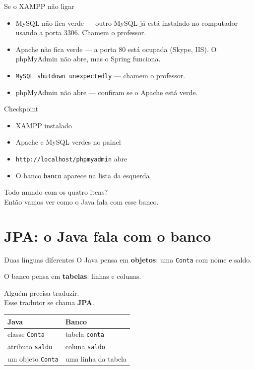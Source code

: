 \documentclass[aspectratio=169,11pt]{beamer}
\begin{document}
\begin{frame}{Se o XAMPP não ligar}
  \begin{itemize}
    \item MySQL não fica verde --- outro MySQL já está instalado
          no computador usando a porta 3306. Chamem o professor.
    \item Apache não fica verde --- a porta 80 está ocupada
          (Skype, IIS). O phpMyAdmin não abre, mas o Spring funciona.
    \item \texttt{MySQL shutdown unexpectedly} --- chamem o professor.
    \item phpMyAdmin não abre --- confiram se o Apache está verde.
  \end{itemize}
\end{frame}

\begin{frame}{Checkpoint}
  \begin{itemize}
    \item [ ] XAMPP instalado
    \item [ ] Apache e MySQL verdes no painel
    \item [ ] \texttt{http://localhost/phpmyadmin} abre
    \item [ ] O banco \texttt{banco} aparece na lista da esquerda
  \end{itemize}

  \vspace{0.6em}
  Todo mundo com os quatro itens?\\
  Então vamos ver como o Java fala com esse banco.
\end{frame}

\section{JPA: o Java fala com o banco}

\begin{frame}{Duas línguas diferentes}
  O Java pensa em \textbf{objetos}: uma \texttt{Conta} com nome e saldo.

  \vspace{0.4em}
  O banco pensa em \textbf{tabelas}: linhas e colunas.

  \vspace{0.6em}
  Alguém precisa traduzir.\\
  Esse tradutor se chama \textbf{JPA}.

  \vspace{0.6em}
  \begin{center}
  \begin{tabular}{ll}
    \toprule
    Java & Banco \\
    \midrule
    classe \texttt{Conta} & tabela \texttt{conta} \\
    atributo \texttt{saldo} & coluna \texttt{saldo} \\
    um objeto \texttt{Conta} & uma linha da tabela \\
    \bottomrule
  \end{tabular}
  \end{center}
\end{frame}
\end{document}
